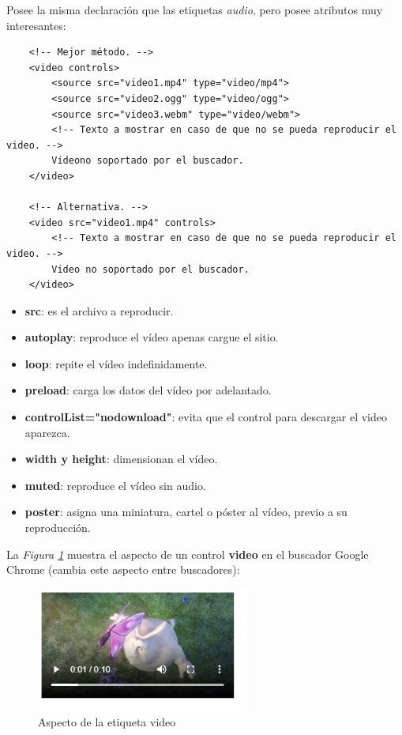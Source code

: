 Posee la misma declaración que las etiquetas \textit{audio}, pero posee atributos muy interesantes:
\begin{lstlisting}
    <!-- Mejor método. -->
    <video controls>
        <source src="video1.mp4" type="video/mp4">
        <source src="video2.ogg" type="video/ogg">
        <source src="video3.webm" type="video/webm">
        <!-- Texto a mostrar en caso de que no se pueda reproducir el video. -->
        Videono soportado por el buscador.
    </video>

    <!-- Alternativa. -->
    <video src="video1.mp4" controls>
        <!-- Texto a mostrar en caso de que no se pueda reproducir el video. -->
        Video no soportado por el buscador.
    </video>
\end{lstlisting}
\begin{itemize}
    \item \textbf{src}: es el archivo a reproducir.
    \item \textbf{autoplay}: reproduce el vídeo apenas cargue el sitio.
    \item \textbf{loop}: repite el vídeo indefinidamente.
    \item \textbf{preload}: carga los datos del vídeo por adelantado.
    \item \textbf{controlList="nodownload"}: evita que el control para descargar el video aparezca.
    \item \textbf{width y height}: dimensionan el vídeo.
    \item \textbf{muted}: reproduce el vídeo sin audio.
    \item \textbf{poster}: asigna una miniatura, cartel o póster al vídeo, previo a su reproducción.
\end{itemize}

La \textit{Figura \ref{fig: 16}} muestra el aspecto de un control \textbf{video} en el buscador Google Chrome (cambia este aspecto entre buscadores):
\begin{figure}[H]
    \centering
    \caption{Aspecto de la etiqueta video}
    \label{fig: 16}
    \includegraphics[width=7cm]{ss_html/video.png}
\end{figure}


